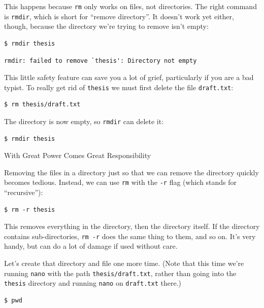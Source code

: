 \documentclass{book}
\begin{document}
This happens because \texttt{rm} only works on files, not directories.
The right command is \texttt{rmdir}, which is short for ``remove
directory''. It doesn't work yet either, though, because the directory
we're trying to remove isn't empty:

\begin{verbatim}
$ rmdir thesis
\end{verbatim}

\begin{verbatim}
rmdir: failed to remove `thesis': Directory not empty
\end{verbatim}

This little safety feature can save you a lot of grief, particularly if
you are a bad typist. To really get rid of \texttt{thesis} we must first
delete the file \texttt{draft.txt}:

\begin{verbatim}
$ rm thesis/draft.txt
\end{verbatim}

The directory is now empty, so \texttt{rmdir} can delete it:

\begin{verbatim}
$ rmdir thesis
\end{verbatim}

\begin{swcbox}{With Great Power Comes Great Responsibility}

Removing the files in a directory just so that we can remove the
directory quickly becomes tedious. Instead, we can use \texttt{rm} with
the \texttt{-r} flag (which stands for ``recursive''):

\begin{verbatim}
$ rm -r thesis
\end{verbatim}

This removes everything in the directory, then the directory itself. If
the directory contains sub-directories, \texttt{rm -r} does the same
thing to them, and so on. It's very handy, but can do a lot of damage if
used without care.

\end{swcbox}

Let's create that directory and file one more time. (Note that this time
we're running \texttt{nano} with the path \texttt{thesis/draft.txt},
rather than going into the \texttt{thesis} directory and running
\texttt{nano} on \texttt{draft.txt} there.)

\begin{verbatim}
$ pwd
\end{verbatim}
\end{document}
